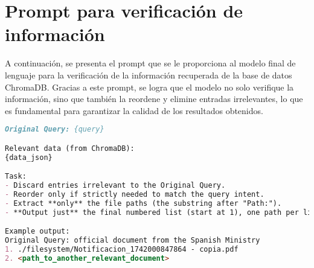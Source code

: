 
\chapter{Prompt para verificación de información}
\label{anx:prompt_verif}

A continuación, se presenta el prompt que se le proporciona al modelo final de lenguaje para la verificación de la información recuperada de la base de datos ChromaDB. Gracias a este prompt, se logra que el modelo no solo verifique la información, sino que también la reordene y elimine entradas irrelevantes, lo que es fundamental para garantizar la calidad de los resultados obtenidos.

\begin{lstlisting}[language=Markdown, caption={Prompt para la descripción de imágenes.}, label={lst:prompt_img_desc}]
Original Query: {query}

Relevant data (from ChromaDB):
{data_json}

Task:
- Discard entries irrelevant to the Original Query.
- Reorder only if strictly needed to match the query intent.
- Extract **only** the file paths (the substring after "Path:").
- **Output just** the final numbered list (start at 1), one path per line, with **no** additional text.

Example output:
Original Query: official document from the Spanish Ministry
1. ./filesystem/Notificacion_1742000847864 - copia.pdf
2. <path_to_another_relevant_document>
\end{lstlisting}